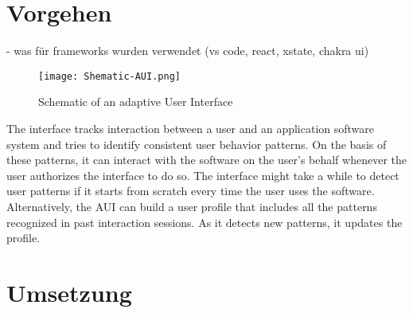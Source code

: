 \chapter{Vorgehen}
- was für frameworks wurden verwendet (vs code, react, xstate, chakra ui)



\begin{figure}[h]
    \centering
    \texttt{[image: Shematic-AUI.png]}
    \caption{Schematic of an adaptive User Interface}
\end{figure}
\newpage
The interface tracks interaction between a user and an application software system and tries to identify consistent user behavior patterns.
On the basis of these patterns, it can interact with the software on the user’s behalf whenever the user authorizes the interface to do
so. The interface might take a while to detect user patterns if it starts from scratch every time the user uses the software. Alternatively,
the AUI can build a user profile that includes all the patterns recognized in past interaction sessions. As it detects new patterns, it updates
the profile.

\chapter{Umsetzung}

